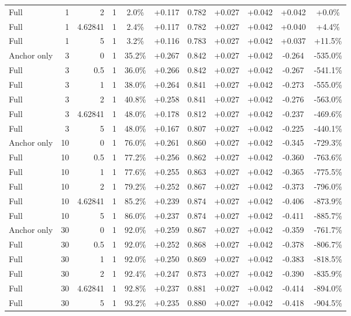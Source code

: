 \begin{table}[htbp]
\begin{tabular}{lrrrccccccc}
Full & 1 & 2 & 1 & 2.0\% & +0.117 & 0.782 & +0.027 & +0.042 & +0.042 & +0.0\% \\
Full & 1 & 4.62841 & 1 & 2.4\% & +0.117 & 0.782 & +0.027 & +0.042 & +0.040 & +4.4\% \\
Full & 1 & 5 & 1 & 3.2\% & +0.116 & 0.783 & +0.027 & +0.042 & +0.037 & +11.5\% \\
Anchor only & 3 & 0 & 1 & 35.2\% & +0.267 & 0.842 & +0.027 & +0.042 & -0.264 & -535.0\% \\
Full & 3 & 0.5 & 1 & 36.0\% & +0.266 & 0.842 & +0.027 & +0.042 & -0.267 & -541.1\% \\
Full & 3 & 1 & 1 & 38.0\% & +0.264 & 0.841 & +0.027 & +0.042 & -0.273 & -555.0\% \\
Full & 3 & 2 & 1 & 40.8\% & +0.258 & 0.841 & +0.027 & +0.042 & -0.276 & -563.0\% \\
Full & 3 & 4.62841 & 1 & 48.0\% & +0.178 & 0.812 & +0.027 & +0.042 & -0.237 & -469.6\% \\
Full & 3 & 5 & 1 & 48.0\% & +0.167 & 0.807 & +0.027 & +0.042 & -0.225 & -440.1\% \\
Anchor only & 10 & 0 & 1 & 76.0\% & +0.261 & 0.860 & +0.027 & +0.042 & -0.345 & -729.3\% \\
Full & 10 & 0.5 & 1 & 77.2\% & +0.256 & 0.862 & +0.027 & +0.042 & -0.360 & -763.6\% \\
Full & 10 & 1 & 1 & 77.6\% & +0.255 & 0.863 & +0.027 & +0.042 & -0.365 & -775.5\% \\
Full & 10 & 2 & 1 & 79.2\% & +0.252 & 0.867 & +0.027 & +0.042 & -0.373 & -796.0\% \\
Full & 10 & 4.62841 & 1 & 85.2\% & +0.239 & 0.874 & +0.027 & +0.042 & -0.406 & -873.9\% \\
Full & 10 & 5 & 1 & 86.0\% & +0.237 & 0.874 & +0.027 & +0.042 & -0.411 & -885.7\% \\
Anchor only & 30 & 0 & 1 & 92.0\% & +0.259 & 0.867 & +0.027 & +0.042 & -0.359 & -761.7\% \\
Full & 30 & 0.5 & 1 & 92.0\% & +0.252 & 0.868 & +0.027 & +0.042 & -0.378 & -806.7\% \\
Full & 30 & 1 & 1 & 92.0\% & +0.250 & 0.869 & +0.027 & +0.042 & -0.383 & -818.5\% \\
Full & 30 & 2 & 1 & 92.4\% & +0.247 & 0.873 & +0.027 & +0.042 & -0.390 & -835.9\% \\
Full & 30 & 4.62841 & 1 & 92.8\% & +0.237 & 0.881 & +0.027 & +0.042 & -0.414 & -894.0\% \\
Full & 30 & 5 & 1 & 93.2\% & +0.235 & 0.880 & +0.027 & +0.042 & -0.418 & -904.5\% \\

\end{tabular}
\end{table}
